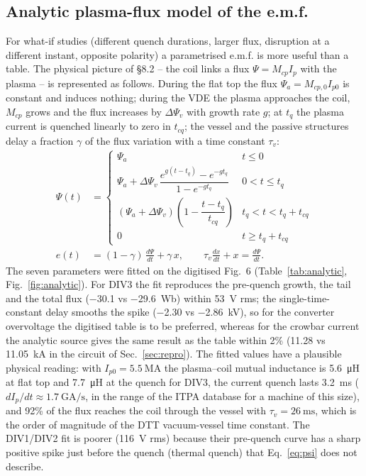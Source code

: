\documentclass[11pt,a4paper]{article}
\begin{document}
\subsection{Analytic plasma-flux model of the e.m.f.}
\label{sec:analytic}
For what-if studies (different quench durations, larger flux, disruption at a different instant, opposite polarity) a parametrised e.m.f. is more useful than a table. The physical picture of \cite{enea_spec} \S8.2 -- the coil links a flux $\Psi = M_{cp} I_p$ with the plasma -- is represented as follows. During the flat top the flux $\Psi_a = M_{cp,0} I_{p0}$ is constant and induces nothing; during the VDE the plasma approaches the coil, $M_{cp}$ grows and the flux increases by $\Delta\Psi_v$ with growth rate $g$; at $t_q$ the plasma current is quenched linearly to zero in $t_{cq}$; the vessel and the passive structures delay a fraction $\gamma$ of the flux variation with a time constant $\tau_v$:
\begin{align}
\Psi(t) &= \begin{cases} \Psi_a & t \le 0\\ \Psi_a + \Delta\Psi_v\, \dfrac{e^{g(t-t_q)} - e^{-g t_q}}{1 - e^{-g t_q}} & 0 < t \le t_q\\[6pt] (\Psi_a + \Delta\Psi_v)\left(1 - \dfrac{t - t_q}{t_{cq}}\right) & t_q < t < t_q + t_{cq}\\[4pt] 0 & t \ge t_q + t_{cq}\end{cases}\label{eq:psi}\\
e(t) &= (1-\gamma)\,\frac{d\Psi}{dt} + \gamma\, x, \qquad \tau_v \frac{dx}{dt} + x = \frac{d\Psi}{dt}. \label{eq:eanalytic}
\end{align}
The seven parameters were fitted on the digitised Fig.~6 (Table~\ref{tab:analytic}, Fig.~\ref{fig:analytic}). For DIV3 the fit reproduces the pre-quench growth, the tail and the total flux (\SI{-30.1}{} vs \SI{-29.6}{\weber}) within \SI{53}{\volt} rms; the single-time-constant delay smooths the spike (\SI{-2.30}{} vs \SI{-2.86}{\kilo\volt}), so for the converter overvoltage the digitised table is to be preferred, whereas for the crowbar current the analytic source gives the same result as the table within 2\% (\SI{11.28}{} vs \SI{11.05}{\kilo\ampere} in the circuit of Sec.~\ref{sec:repro}). The fitted values have a plausible physical reading: with $I_{p0} = \SI{5.5}{\mega\ampere}$ the plasma--coil mutual inductance is \SI{5.6}{\micro\henry} at flat top and \SI{7.7}{\micro\henry} at the quench for DIV3, the current quench lasts \SI{3.2}{\milli\second} ($dI_p/dt \approx \SI{1.7}{\giga\ampere\per\second}$, in the range of the ITPA database \cite{eidietis2015} for a machine of this size), and 92\% of the flux reaches the coil through the vessel with $\tau_v = \SI{26}{\milli\second}$, which is the order of magnitude of the DTT vacuum-vessel time constant. The DIV1/DIV2 fit is poorer (\SI{116}{\volt} rms) because their pre-quench curve has a sharp positive spike just before the quench (thermal quench) that Eq.~\eqref{eq:psi} does not describe.
\end{document}
